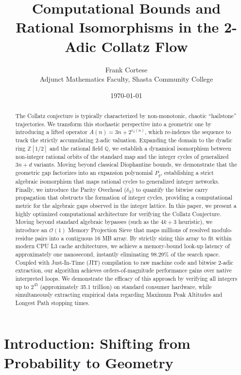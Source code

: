 \documentclass[11pt, a4paper]{article}
\title{Computational Bounds and Rational Isomorphisms in the 2-Adic Collatz Flow}
\author{Frank Cortese \\ \small{Adjunct Mathematics Faculty, Shasta Community College}}
\date{\today}
\theoremstyle{definition}
\begin{document}
\maketitle

\begin{abstract}
The Collatz conjecture is typically characterized by non-monotonic, chaotic ``hailstone'' trajectories. We transform this stochastic perspective into a geometric one by introducing a lifted operator $A(n)=3n+2^{v_2(n)}$, which re-indexes the sequence to track the strictly accumulating 2-adic valuation. Expanding the domain to the dyadic ring $\mathbb{Z}[1/2]$ and the rational field $\mathbb{Q}$, we establish a dynamical isomorphism between non-integer rational orbits of the standard map and the integer cycles of generalized $3n+d$ variants. Moving beyond classical Diophantine bounds, we demonstrate that the geometric gap factorizes into an expansion polynomial $P_g$, establishing a strict algebraic isomorphism that maps rational cycles to generalized integer networks. Finally, we introduce the Parity Overhead ($\delta_S$) to quantify the bitwise carry propagation that obstructs the formation of integer cycles, providing a computational metric for the algebraic gaps observed in the integer lattice. In this paper, we present a highly optimized computational architecture for verifying the Collatz Conjecture. Moving beyond standard algebraic bypasses (such as the $4k+3$ heuristic), we introduce an $\mathcal{O}(1)$ Memory Projection Sieve that maps millions of resolved modulo-residue pairs into a contiguous 16 MB array. By strictly sizing this array to fit within modern CPU L3 cache architectures, we achieve a memory-bound look-up latency of approximately one nanosecond, instantly eliminating 98.29\% of the search space. Coupled with Just-In-Time (JIT) compilation to raw machine code and bitwise 2-adic extraction, our algorithm achieves orders-of-magnitude performance gains over native interpreted loops. We demonstrate the efficacy of this approach by verifying all integers up to $2^{45}$ (approximately 35.1 trillion) on standard consumer hardware, while simultaneously extracting empirical data regarding Maximum Peak Altitudes and Longest Path stopping times.
\end{abstract}

\section{Introduction: Shifting from Probability to Geometry}
\end{document}
